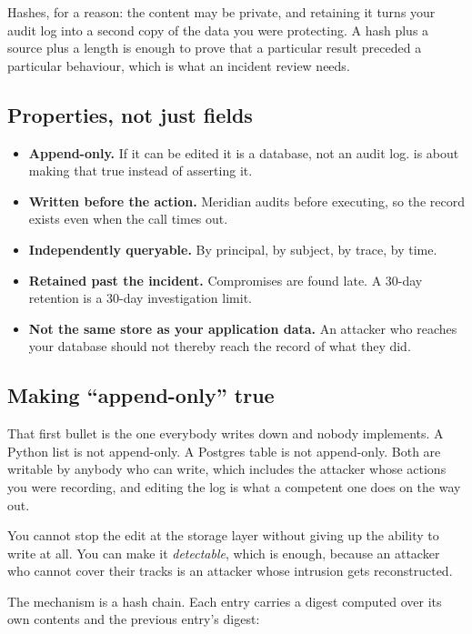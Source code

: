 Hashes, for a reason: the content may be private, and retaining it turns your
audit log into a second copy of the data you were protecting. A hash plus a source plus a length is enough to prove that a
particular result preceded a particular behaviour, which is what an incident
review needs.

\subsection{Properties, not just fields}

\begin{itemize}[leftmargin=1.6em, itemsep=3pt]
\item \textbf{Append-only.} If it can be edited it is a database, not an audit
log.  is about making that true instead of asserting it.
\item \textbf{Written before the action.} Meridian audits before executing, so
the record exists even when the call times out.
\item \textbf{Independently queryable.} By principal, by subject, by trace, by
time.
\item \textbf{Retained past the incident.} Compromises are found late. A 30-day
retention is a 30-day investigation limit.
\item \textbf{Not the same store as your application data.} An attacker who
reaches your database should not thereby reach the record of what they did.
\end{itemize}

\subsection{Making ``append-only'' true}
\label{sec:tamper-evident}

That first bullet is the one everybody writes down and nobody implements. A
Python list is not append-only. A Postgres table is not append-only. Both are
writable by anybody who can write, which includes the attacker whose actions you
were recording, and editing the log is what a competent one does on the way out.

You cannot stop the edit at the storage layer without giving up the ability to
write at all. You can make it \emph{detectable}, which is enough, because an
attacker who cannot cover their tracks is an attacker whose intrusion gets
reconstructed.

The mechanism is a hash chain. Each entry carries a digest computed over its own
contents and the previous entry's digest:

